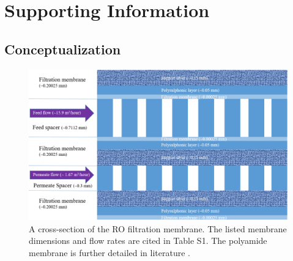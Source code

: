 


\section{\huge \textbf{Supporting Information}}

\beginsupplement

\subsection{Conceptualization}

\begin{figure}[h]
    \centering
    \includegraphics[width = \textwidth]{images/supporting_information/membrane_scheme_3.PNG}
    \caption{
        A cross-section of the RO filtration membrane. The listed membrane dimensions and flow rates are cited in Table S1. The polyamide membrane is further detailed in literature \cite{Strubbe2018CalibrationFull-Scale}. 
    }
    \label{membrane_scheme}
\end{figure}

